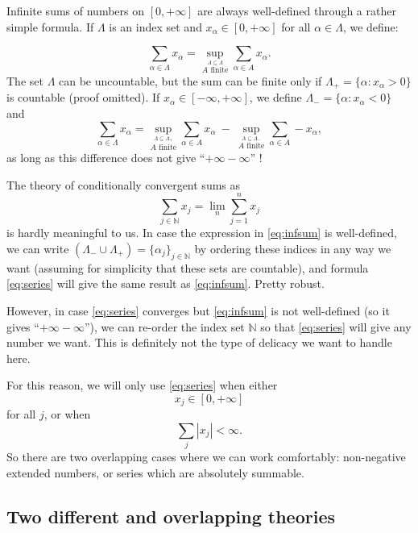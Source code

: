 \documentclass[
]{book}
\newcommand{\N}{\mathbb{N}}
\theoremstyle{definition}
\theoremstyle{definition}
\theoremstyle{definition}
\theoremstyle{definition}
\theoremstyle{remark}
\begin{document}
Infinite sums of numbers on \([0,+\infty]\) are always well-defined
through a rather simple formula. If \(\Lambda\) is an index set and
\(x_\alpha \in [0,+\infty]\) for all \(\alpha \in \Lambda\), we define:

\[\nonumber
\sum_{\alpha \in \Lambda} x_\alpha = \sup_{\stackrel{A \subseteq \Lambda}{A \text{ finite}}} \sum_{\alpha \in A} x_\alpha
.\] The set \(\Lambda\) can be uncountable, but the sum can be finite only
if \(\Lambda_+ = \{\alpha:x_\alpha>0\}\) is countable (proof omitted). If
\(x_\alpha \in [-\infty,+\infty]\), we define
\(\Lambda_- = \{\alpha:x_\alpha<0\}\) and
\begin{equation}
\sum_{\alpha \in \Lambda} x_\alpha =
\sup_{\stackrel{A \subseteq \Lambda_+}{A \text{ finite}}} \sum_{\alpha \in A} x_\alpha
\
-
\
\sup_{\stackrel{A \subseteq \Lambda_-}{A \text{ finite}}} \sum_{\alpha \in A} -x_\alpha
,
\label{eq:infsum}
\end{equation}
as long as this difference does not give ``\(+\infty-\infty\)'' !

The theory of conditionally convergent sums as
\begin{equation}
\sum_{j \in \N} x_j
=
\lim_n
\sum_{j = 1}^n x_j
\label{eq:series}
\end{equation}
is hardly meaningful to us. In case the expression
in \eqref{eq:infsum} is well-defined, we can write
\((\Lambda_- \cup \Lambda_+) = \{\alpha_j\}_{j\in\N}\) by ordering these
indices in any way we want (assuming for simplicity that these sets are
countable), and formula \eqref{eq:series} will give the same result
as \eqref{eq:infsum}. Pretty robust.

However, in case \eqref{eq:series} converges
but \eqref{eq:infsum} is not well-defined (so it gives
``\(+\infty-\infty\)''), we can re-order the index set \(\N\) so
that \eqref{eq:series} will give any number we want. This is definitely
not the type of delicacy we want to handle here.

For this reason, we will only
use \eqref{eq:series} when either \[x_j \in [0,+\infty]\] for all \(j\),
or when \[\sum_j |x_j| < \infty .\] So there are two overlapping cases
where we can work comfortably: non-negative extended numbers, or series
which are absolutely summable.

\hypertarget{two-different-and-overlapping-theories}{%
\subsection{Two different and overlapping theories}\label{two-different-and-overlapping-theories}}
\end{document}
